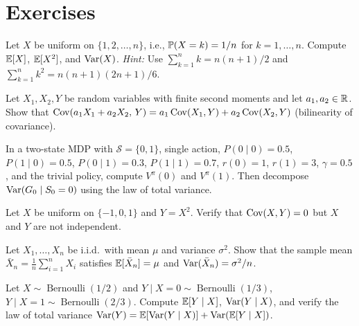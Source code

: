 \documentclass[11pt,a4paper]{article}
\begin{document}

\section{Exercises}
\label{sec:exercises}

\begin{exercise}
\label{ex:var_uniform}
Let $X$ be uniform on $\{1, 2, \ldots, n\}$, i.e.,
$\mathbb{P}(X = k) = 1/n$ for $k = 1, \ldots, n$.  Compute
$\mathbb{E}[X]$, $\mathbb{E}[X^2]$, and $\operatorname{Var}(X)$.
\textit{Hint:} Use $\sum_{k=1}^n k = n(n+1)/2$ and
$\sum_{k=1}^n k^2 = n(n+1)(2n+1)/6$.
\end{exercise}

\begin{exercise}
\label{ex:cov_bilinearity}
Let $X_1, X_2, Y$ be random variables with finite second moments
and let $a_1, a_2 \in \mathbb{R}$.  Show that
$\operatorname{Cov}(a_1 X_1 + a_2 X_2,\, Y)
= a_1 \operatorname{Cov}(X_1, Y) + a_2 \operatorname{Cov}(X_2, Y)$
(bilinearity of covariance).
\end{exercise}

\begin{exercise}
\label{ex:total_var_two_state}
In a two-state MDP with $\mathcal{S} = \{0, 1\}$, single action,
$P(0 \mid 0) = 0.5$, $P(1 \mid 0) = 0.5$,
$P(0 \mid 1) = 0.3$, $P(1 \mid 1) = 0.7$,
$r(0) = 1$, $r(1) = 3$, $\gamma = 0.5$, and the trivial policy,
compute $V^\pi(0)$ and $V^\pi(1)$.  Then decompose
$\operatorname{Var}(G_0 \mid S_0 = 0)$ using the law of total variance.
\end{exercise}

\begin{exercise}
\label{ex:uncorrelated_not_independent}
Let $X$ be uniform on $\{-1, 0, 1\}$ and $Y = X^2$.  Verify
that $\operatorname{Cov}(X, Y) = 0$ but $X$ and $Y$ are not independent.
\end{exercise}

\begin{exercise}
\label{ex:var_sample_mean}
Let $X_1, \ldots, X_n$ be i.i.d.\ with mean $\mu$ and variance
$\sigma^2$.  Show that the sample mean
$\bar{X}_n = \frac{1}{n}\sum_{i=1}^n X_i$ satisfies
$\mathbb{E}[\bar{X}_n] = \mu$ and
$\operatorname{Var}(\bar{X}_n) = \sigma^2/n$.
\end{exercise}

\begin{exercise}
\label{ex:conditional_variance_compute}
Let $X \sim \operatorname{Bernoulli}(1/2)$ and
$Y \mid X = 0 \sim \operatorname{Bernoulli}(1/3)$,
$Y \mid X = 1 \sim \operatorname{Bernoulli}(2/3)$.
Compute $\mathbb{E}[Y \mid X]$, $\operatorname{Var}(Y \mid X)$, and verify the law of
total variance $\operatorname{Var}(Y) = \mathbb{E}[\operatorname{Var}(Y \mid X)] + \operatorname{Var}(\mathbb{E}[Y \mid X])$.
\end{exercise}
\end{document}
